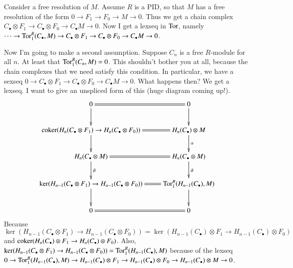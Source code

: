 Consider a free resolution of $M$. Assume $R$ is a PID, so that $M$ has a free resolution of the form $0\to F_1\to F_0\to M\to 0$. Thus we get a chain complex $C_\bullet\otimes F_1\to C_\bullet\otimes F_0\to C_\bullet M\to 0$. Now I get a lexseq in $\operatorname{Tor}$, namely $\cdots\to\operatorname{Tor}^R_1(C_\bullet,M)\to C_\bullet\otimes F_1\to C_\bullet\otimes F_0\to C_\bullet M\to 0$.

Now I'm going to make a second assumption. Suppose $C_n$ is a free $R$-module for all $n$. At least that $\operatorname{Tor}^R_1(C_n,M)=0$. This shouldn't bother you at all, because the chain complexes that we need satisfy this condition. In particular, we have a sexseq $0\to C_\bullet\otimes F_1\to C_\bullet\otimes F_0\to C_\bullet M\to 0$. What happens then? We get a lexseq. I want to give an unspliced form of this (huge diagram coming up!).
\begin{equation*}
\xymatrix{0\ar[d]\ar@{=}[r] & 0\ar[d]\\
\coker( H_n(C_\bullet\otimes F_1)\to H_n(C_\bullet\otimes F_0))\ar[d]\ar@{=}[r] & H_n(C_\bullet)\otimes M\ar[d]^\alpha\\
 H_n(C_\bullet\otimes M)\ar[d]^\partial\ar@{=}[r] & H_n(C_\bullet\otimes M)\ar[d]^\partial\\
\ker( H_{n-1}(C_\bullet\otimes F_1)\to H_{n-1}(C_\bullet\otimes F_0))\ar@{=}[r]\ar[d] & \Tor^R_{1}( H_{n-1}(C_\bullet),M)\ar[d]\\
0\ar@{=}[r] & 0}
\end{equation*}
Because $\ker( H_{n-1}(C_\bullet\otimes F_1)\to H_{n-1}(C_\bullet\otimes F_0))=\ker( H_{n-1}(C_\bullet)\otimes F_1\to H_{n-1}(C_\bullet)\otimes F_0)$ and $\operatorname{coker}( H_n(C_\bullet)\otimes F_1\to H_n(C_\bullet)\otimes F_0)$. Also, $\ker( H_{n-1}(C_\bullet\otimes F_1)\to H_{n-1}(C_\bullet\otimes F_0))=\operatorname{Tor}^R_{1}( H_{n-1}(C_\bullet),M)$ because of the lexseq $0\to \operatorname{Tor}^R_1( H_{n-1}(C_\bullet),M)\to H_{n-1}(C_\bullet)\otimes F_1\to H_{n-1}(C_\bullet)\otimes F_0\to H_{n-1}(C_\bullet)\otimes M\to 0$.

